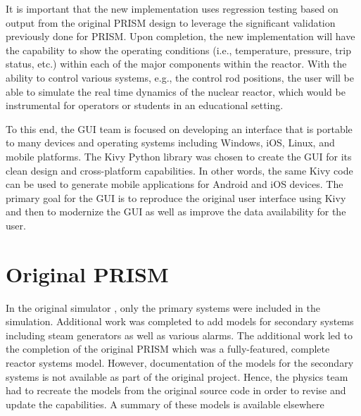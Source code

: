 \documentclass{anstrans}
\begin{document}
    It is important that the new implementation uses regression testing based on
    output from the original
    PRISM design to leverage the significant validation previously done for  
    PRISM.  Upon completion, the new implementation will have the capability to 
    show the operating conditions (i.e., temperature, pressure, trip status, etc.) 
    within each of the major components within the reactor.  With the ability to control
    various systems, e.g., the control rod positions, the user will be able to simulate
    the real time dynamics of the nuclear reactor, which would be instrumental for 
    operators or students in an educational setting.
    
    To this end, the GUI team is focused on developing an interface that is portable
    to many devices and operating systems including Windows, iOS, Linux, and mobile 
    platforms.  The Kivy Python library \cite{kivy} was chosen to create the GUI for its 
    clean design and cross-platform capabilities.  In other words, the same Kivy
    code can be used to generate mobile applications for Android and iOS devices.
    The primary goal for the GUI is to reproduce the original user interface using Kivy
    and then to modernize the GUI as well as improve the data availability for the user.
    
    \section{Original PRISM}
    
    In the original simulator \cite{kao1984}, only the primary systems were 
    included in the simulation.  Additional work was completed 
    to add models for secondary systems including steam generators as well as 
    various alarms.  The additional work led to the completion
    of the original PRISM which 
    was a fully-featured, complete reactor systems model. However, documentation
    of the models for the secondary systems is not available as part of the original
    project.  Hence, the physics
    team had to recreate the models from the original source code in order to revise
    and update the capabilities. A summary of these models is available elsewhere
    \cite{github-io}
    
\end{document}
